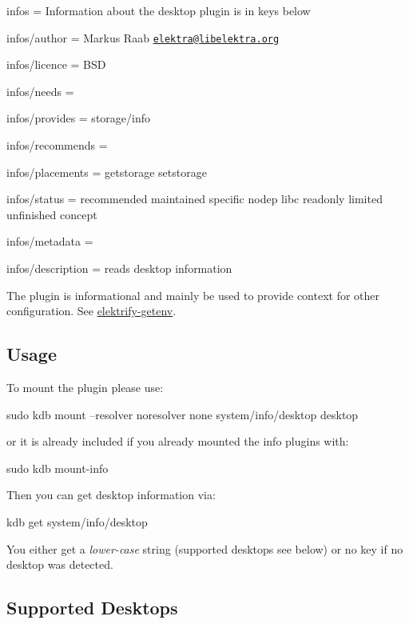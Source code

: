 
\begin{DoxyItemize}
\item infos = Information about the desktop plugin is in keys below
\item infos/author = Markus Raab \href{mailto:elektra@libelektra.org}{\tt elektra@libelektra.\+org}
\item infos/licence = B\+SD
\item infos/needs =
\item infos/provides = storage/info
\item infos/recommends =
\item infos/placements = getstorage setstorage
\item infos/status = recommended maintained specific nodep libc readonly limited unfinished concept
\item infos/metadata =
\item infos/description = reads desktop information
\end{DoxyItemize}

The plugin is informational and mainly be used to provide context for other configuration. See \hyperlink{src_libs_getenv_README_md}{elektrify-\/getenv}.

\subsection*{Usage}

To mount the plugin please use\+:


\begin{DoxyCode}
sudo kdb mount --resolver noresolver none system/info/desktop desktop
\end{DoxyCode}


or it is already included if you already mounted the info plugins with\+:


\begin{DoxyCode}
sudo kdb mount-info
\end{DoxyCode}


Then you can get desktop information via\+:


\begin{DoxyCode}
kdb get system/info/desktop
\end{DoxyCode}


You either get a {\itshape lower-\/case} string (supported desktops see below) or no key if no desktop was detected.

\subsection*{Supported Desktops}

